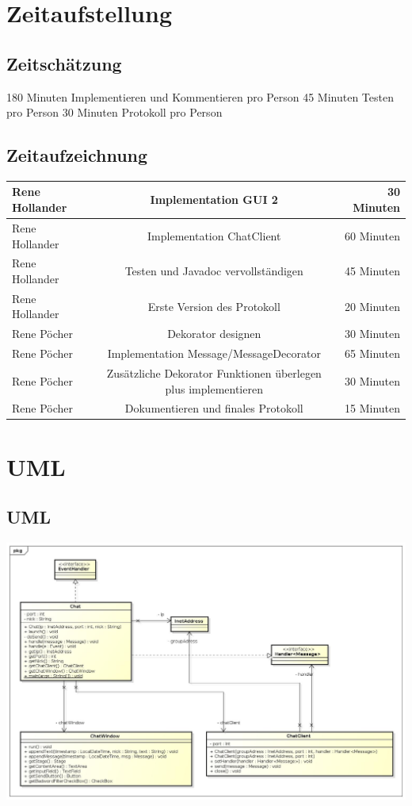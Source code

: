 \documentclass[a4paper, 11pt]{article}
\begin{document}
\section{Zeitaufstellung}

\subsection{Zeitschätzung}
180 Minuten Implementieren und Kommentieren pro Person
45 Minuten Testen pro Person
30 Minuten Protokoll pro Person

\subsection{Zeitaufzeichnung}

\begin{tabular}{|l|c|r|}
  \hline
  Rene Hollander & Implementation GUI 2 & 30 Minuten\\
  \hline
  Rene Hollander & Implementation ChatClient & 60 Minuten \\
  \hline
  Rene Hollander & Testen und Javadoc vervollständigen & 45 Minuten \\
  \hline
  Rene Hollander & Erste Version des Protokoll & 20 Minuten \\
  
    \hline
    Rene Pöcher &  Dekorator designen & 30 Minuten\\
    \hline
    Rene Pöcher & Implementation Message/MessageDecorator & 65 Minuten \\
    \hline
    Rene Pöcher & Zusätzliche Dekorator Funktionen überlegen plus implementieren & 30 Minuten \\
    \hline
    Rene Pöcher & Dokumentieren und finales Protokoll & 15 Minuten \\
    \hline
 \end{tabular}

\section{UML}
\subsection{UML}
\includegraphics[width=15.5cm]{UML}
\end{document}
